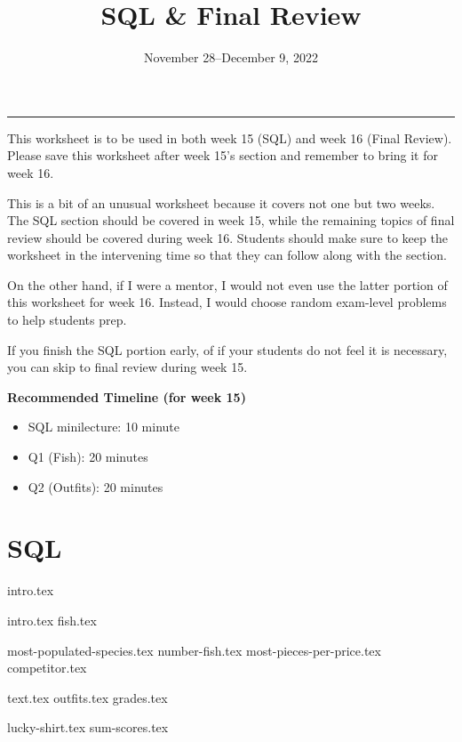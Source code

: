 \documentclass{exam}
\title{SQL \& Final Review}
\date{November 28--December 9, 2022}
\begin{document}
\maketitle\rule{\textwidth}{0.15em}

This worksheet is to be used in both week 15 (SQL) and week 16 (Final Review). Please save this worksheet after week 15's section and remember to bring it for week 16.

\begin{guide}
    This is a bit of an unusual worksheet because it covers not one but two weeks. The SQL section should be covered in week 15, while the 
    remaining topics of final review should be covered during week 16. Students should make sure to keep the worksheet in the 
    intervening time so that they can follow along with the section.  

    On the other hand, if I were a mentor, I would not even use the latter portion of this worksheet for week 16.
    Instead, I would choose random exam-level problems to help students prep. 

    If you finish the SQL portion early, of if your students do not feel it is necessary, you can skip to final review during week 15. 

    \textbf{Recommended Timeline (for week 15)}
    \begin{itemize}
        \item SQL minilecture: 10 minute
        \item Q1 (Fish): 20 minutes
        \item Q2 (Outfits): 20 minutes
    \end{itemize}
\end{guide}


\section{SQL}
{intro.tex}
\newpage
\begin{questions}
  \question 
  {intro.tex}
  {fish.tex}
  \begin{parts}
    {most-populated-species.tex}
    {number-fish.tex}
    {most-pieces-per-price.tex}
    {competitor.tex}
  \end{parts}
  \newpage
  \question
  {text.tex}
  {outfits.tex}
  {grades.tex}
  \begin{parts}
  {lucky-shirt.tex}
  {sum-scores.tex}
  \end{parts}
\end{questions}
\end{document}
